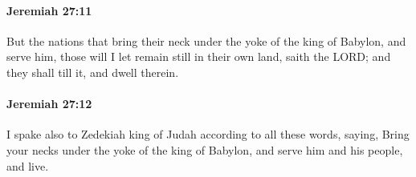 		\paragraph{Jeremiah 27:11} %
			\label{JEREMIAH-27-11}

			But the nations that bring their neck under the yoke of the king of Babylon, and serve him, those will I let remain still in their own land, saith the LORD; and they shall till it, and dwell therein.


		\paragraph{Jeremiah 27:12} %
			\label{JEREMIAH-27-12}

			I spake also to Zedekiah king of Judah according to all these words, saying, Bring your necks under the yoke of the king of Babylon, and serve him and his people, and live.

